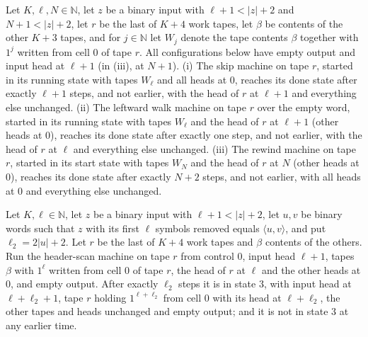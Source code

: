 \begin{theorem}
\label{Complexity.f6_ruler_moves}
\leanok
{}
Let $K,\ell,N\in\mathbb{N}$, let $z$ be a binary input with $\ell+1<|z|+2$ and $N+1<|z|+2$, let $r$
be the last of $K+4$ work tapes, let $\beta$ be contents of the other $K+3$ tapes, and for
$j\in\mathbb{N}$ let $W_j$ denote the tape contents $\beta$ together with $1^j$ written from cell
$0$ of tape $r$. All configurations below have empty output and input head at $\ell+1$ (in (iii),
at $N+1$). (i) The skip machine on tape $r$, started in its running state with tapes $W_\ell$ and
all heads at $0$, reaches its done state after exactly $\ell+1$ steps, and not earlier, with the
head of $r$ at $\ell+1$ and everything else unchanged. (ii) The leftward walk machine on tape $r$
over the empty word, started in its running state with tapes $W_\ell$ and the head of $r$ at
$\ell+1$ (other heads at $0$), reaches its done state after exactly one step, and not earlier,
with the head of $r$ at $\ell$ and everything else unchanged. (iii) The rewind machine on tape $r$,
started in its start state with tapes $W_N$ and the head of $r$ at $N$ (other heads at $0$),
reaches its done state after exactly $N+2$ steps, and not earlier, with all heads at $0$ and
everything else unchanged.
\end{theorem}

\begin{theorem}
\label{Complexity.f6_scan}
\leanok
{}
Let $K,\ell\in\mathbb{N}$, let $z$ be a binary input with $\ell+1<|z|+2$, let $u,v$ be binary
words such that $z$ with its first $\ell$ symbols removed equals $\langle u,v\rangle$, and put
$\ell_2=2|u|+2$. Let $r$ be the last of $K+4$ work tapes and $\beta$ contents of the others. Run
the header-scan machine on tape $r$ from control $0$, input head $\ell+1$, tapes $\beta$ with
$1^\ell$ written from cell $0$ of tape $r$, the head of $r$ at $\ell$ and the other heads at $0$,
and empty output. After exactly $\ell_2$ steps it is in state $3$, with input head at
$\ell+\ell_2+1$, tape $r$ holding $1^{\ell+\ell_2}$ from cell $0$ with its head at $\ell+\ell_2$, the
other tapes and heads unchanged and empty output; and it is not in state $3$ at any earlier time.
\end{theorem}

